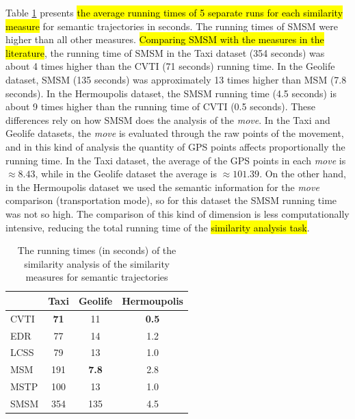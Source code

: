 Table \ref{tab:running_time_semantic} presents \hl{the average running times of 5 separate runs for each similarity measure} for semantic trajectories in seconds. The running times of SMSM were higher than all other measures. \hl{Comparing SMSM with the measures in the literature}, the running time of SMSM in the Taxi dataset (354 seconds) was about 4 times higher than the CVTI (71 seconds) running time. In the Geolife dataset, SMSM (135 seconds) was approximately 13 times higher than MSM (7.8 seconds). In the Hermoupolis dataset, the SMSM running time (4.5 seconds) is about 9 times higher than the running time of CVTI (0.5 seconds). These differences rely on how SMSM does the analysis of the \emph{move}. In the Taxi and Geolife datasets, the \emph{move} is evaluated through the raw points of the movement, and in this kind of analysis the quantity of GPS points affects proportionally the running time. In the Taxi dataset, the average of the GPS points in each \emph{move} is $\approx 8.43$, while in the Geolife dataset the average is $\approx 101.39$. On the other hand, in the Hermoupolis dataset we used the semantic information for the \emph{move} comparison (transportation mode), so for this dataset the SMSM running time was not so high. The comparison of this kind of dimension is less computationally intensive, reducing the total running time of the \hl{similarity analysis task}.%

\begin{table}[ht!]
  \scriptsize
  \centering
  \begin{tabular}{|l|c|c|c|}
  \hline
& Taxi & Geolife & Hermoupolis\\
  \hline
CVTI & \textbf{71} & 11 & \textbf{0.5}\\
EDR & 77 & 14 & 1.2\\
LCSS & 79 & 13 & 1.0 \\
MSM & 191 & \textbf{7.8} & 2.8\\
MSTP & 100 & 13 & 1.0\\
SMSM & 354 & 135 & 4.5\\
    \hline
  \end{tabular}
  \caption{The running times (in seconds) of the similarity analysis of the similarity measures for semantic trajectories}
  \label{tab:running_time_semantic}
\end{table}

